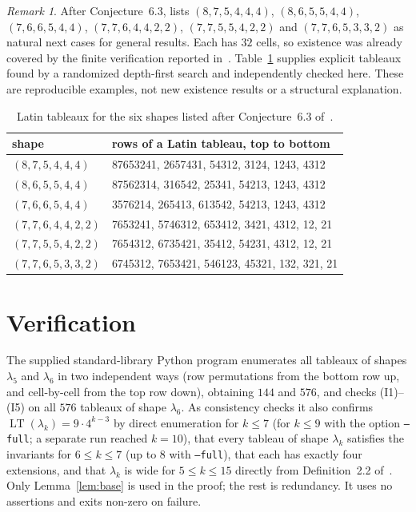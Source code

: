 \documentclass[11pt]{amsart}
\theoremstyle{definition}
\theoremstyle{remark}
\newtheorem{remark}[theorem]{Remark}
\newcommand{\LT}{\operatorname{LT}}
\begin{document}
\begin{remark}\label{rem:six}
After Conjecture~6.3, \cite[\S6]{DFHLMP2026} lists $(8,7,5,4,4,4)$, $(8,6,5,5,4,4)$, $(7,6,6,5,4,4)$, $(7,7,6,4,4,2,2)$, $(7,7,5,5,4,2,2)$ and $(7,7,6,5,3,3,2)$ as natural next cases for general results. Each has $32$ cells, so existence was already covered by the finite verification reported in~\cite{CFGV2003}. Table~\ref{tab:six} supplies explicit tableaux found by a randomized depth-first search and independently checked here. These are reproducible examples, not new existence results or a structural explanation.
\end{remark}

\begin{table}[ht]
\centering\small
\begin{tabular}{ll}
\toprule
shape & rows of a Latin tableau, top to bottom\\
\midrule
$(8,7,5,4,4,4)$ & 87653241, 2657431, 54312, 3124, 1243, 4312\\
$(8,6,5,5,4,4)$ & 87562314, 316542, 25341, 54213, 1243, 4312\\
$(7,6,6,5,4,4)$ & 3576214, 265413, 613542, 54213, 1243, 4312\\
$(7,7,6,4,4,2,2)$ & 7653241, 5746312, 653412, 3421, 4312, 12, 21\\
$(7,7,5,5,4,2,2)$ & 7654312, 6735421, 35412, 54231, 4312, 12, 21\\
$(7,7,6,5,3,3,2)$ & 6745312, 7653421, 546123, 45321, 132, 321, 21\\
\bottomrule
\end{tabular}
\caption{Latin tableaux for the six shapes listed after Conjecture~6.3 of~\cite{DFHLMP2026}.}
\label{tab:six}
\end{table}

\section{Verification}\label{sec:verify}

The supplied standard-library Python program enumerates all tableaux of shapes $\lambda_5$ and $\lambda_6$ in two independent ways (row permutations from the bottom row up, and cell-by-cell from the top row down), obtaining $144$ and $576$, and checks (I1)--(I5) on all $576$ tableaux of shape $\lambda_6$. As consistency checks it also confirms $\LT(\lambda_k)=9\cdot4^{k-3}$ by direct enumeration for $k\le7$ (for $k\le9$ with the option \texttt{--full}; a separate run reached $k=10$), that every tableau of shape $\lambda_k$ satisfies the invariants for $6\le k\le7$ (up to $8$ with \texttt{--full}), that each has exactly four extensions, and that $\lambda_k$ is wide for $5\le k\le15$ directly from Definition~2.2 of~\cite{DFHLMP2026}. Only Lemma~\ref{lem:base} is used in the proof; the rest is redundancy. It uses no assertions and exits non-zero on failure.
\end{document}
